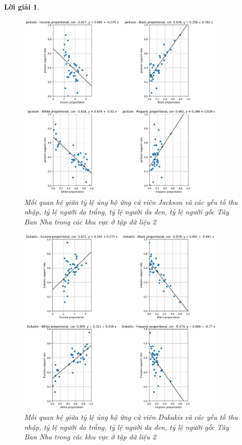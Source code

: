 \documentclass[14pt, a4paper]{article}
\theoremstyle{sltheorem}
\theoremstyle{soltheorem}
\newtheorem*{loigiai}{Lời giải}
\begin{document}
\begin{loigiai}
\begin{enumerate}
    \begin{figure}[H]
        \centering
        \includegraphics[width=0.9\textwidth]{figures/Jackson_candidate_relationship_factor.png}
        \caption{Mối quan hệ giữa tỷ lệ ủng hộ ứng cử viên Jackson và các yếu tố thu nhập, tỷ lệ người da trắng, tỷ lệ người da đen, tỷ lệ người gốc Tây Ban Nha trong các khu vực ở tập dữ liệu 2}
        \label{fig:Jackson_candidate_relationship_factor}
    \end{figure}

    \begin{figure}[H]
        \centering
        \includegraphics[width=0.9\textwidth]{figures/Dukakis_candidate_relationship_factor.png}
        \caption{Mối quan hệ giữa tỷ lệ ủng hộ ứng cử viên Dukakis và các yếu tố thu nhập, tỷ lệ người da trắng, tỷ lệ người da đen, tỷ lệ người gốc Tây Ban Nha trong các khu vực ở tập dữ liệu 2}
        \label{fig:Dukakis_candidate_relationship_factor}
    \end{figure}


\end{enumerate}
\end{loigiai}
\end{document}
